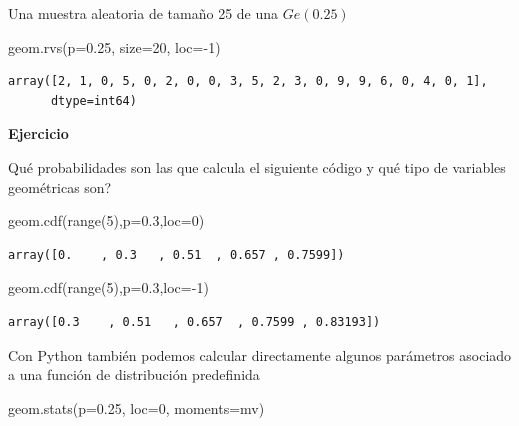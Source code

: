 \documentclass[
  letterpaper,
  DIV=11,
  numbers=noendperiod]{scrreprt}
\newenvironment{Shaded}{\begin{snugshade}}{\end{snugshade}}
\newcommand{\BuiltInTok}[1]{\textcolor[rgb]{0.00,0.23,0.31}{#1}}
\newcommand{\DecValTok}[1]{\textcolor[rgb]{0.68,0.00,0.00}{#1}}
\newcommand{\FloatTok}[1]{\textcolor[rgb]{0.68,0.00,0.00}{#1}}
\newcommand{\NormalTok}[1]{\textcolor[rgb]{0.00,0.23,0.31}{#1}}
\newcommand{\OperatorTok}[1]{\textcolor[rgb]{0.37,0.37,0.37}{#1}}
\newcommand{\StringTok}[1]{\textcolor[rgb]{0.13,0.47,0.30}{#1}}
\begin{document}
Una muestra aleatoria de tamaño 25 de una \(Ge(0.25)\)

\begin{Shaded}
\begin{Highlighting}[]
\NormalTok{geom.rvs(p}\OperatorTok{=}\FloatTok{0.25}\NormalTok{, size}\OperatorTok{=}\DecValTok{20}\NormalTok{, loc}\OperatorTok{={-}}\DecValTok{1}\NormalTok{)}
\end{Highlighting}
\end{Shaded}

\begin{verbatim}
array([2, 1, 0, 5, 0, 2, 0, 0, 3, 5, 2, 3, 0, 9, 9, 6, 0, 4, 0, 1],
      dtype=int64)
\end{verbatim}

\textbf{Ejercicio}

Qué probabilidades son las que calcula el siguiente código y qué tipo de
variables geométricas son?

\begin{Shaded}
\begin{Highlighting}[]
\NormalTok{geom.cdf(}\BuiltInTok{range}\NormalTok{(}\DecValTok{5}\NormalTok{),p}\OperatorTok{=}\FloatTok{0.3}\NormalTok{,loc}\OperatorTok{=}\DecValTok{0}\NormalTok{)}
\end{Highlighting}
\end{Shaded}

\begin{verbatim}
array([0.    , 0.3   , 0.51  , 0.657 , 0.7599])
\end{verbatim}

\begin{Shaded}
\begin{Highlighting}[]
\NormalTok{geom.cdf(}\BuiltInTok{range}\NormalTok{(}\DecValTok{5}\NormalTok{),p}\OperatorTok{=}\FloatTok{0.3}\NormalTok{,loc}\OperatorTok{={-}}\DecValTok{1}\NormalTok{)}
\end{Highlighting}
\end{Shaded}

\begin{verbatim}
array([0.3    , 0.51   , 0.657  , 0.7599 , 0.83193])
\end{verbatim}

Con Python también podemos calcular directamente algunos parámetros
asociado a una función de distribución predefinida

\begin{Shaded}
\begin{Highlighting}[]
\NormalTok{geom.stats(p}\OperatorTok{=}\FloatTok{0.25}\NormalTok{, loc}\OperatorTok{=}\DecValTok{0}\NormalTok{, moments}\OperatorTok{=}\StringTok{\textquotesingle{}mv\textquotesingle{}}\NormalTok{)}
\end{Highlighting}
\end{Shaded}
\end{document}
